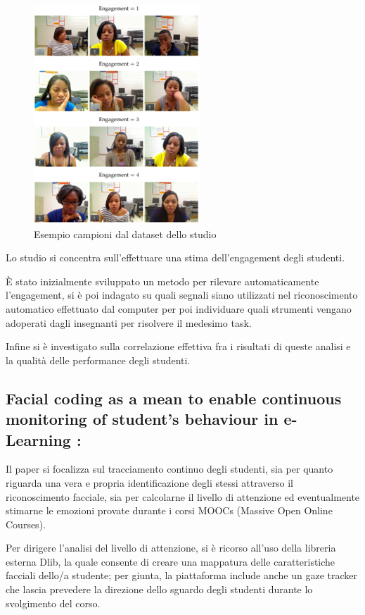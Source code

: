 \begin{figure}
    \begin{center}    
        \includegraphics[width=0.4\linewidth]{images/2.png}
        \caption{Esempio campioni dal dataset dello studio}
    \end{center}
\end{figure}


Lo studio si concentra sull’effettuare una stima dell’engagement degli studenti. 

È stato inizialmente sviluppato un metodo per rilevare automaticamente l’engagement, si è poi indagato su quali segnali siano utilizzati nel riconoscimento automatico effettuato dal computer per poi individuare quali strumenti vengano adoperati dagli insegnanti per risolvere il medesimo task.

Infine si è investigato sulla correlazione effettiva fra i risultati di queste analisi e la qualità delle performance degli studenti.

\subsection{Facial coding as a mean to enable continuous monitoring of student’s behaviour in e-Learning \cite{FacialCodingContinMonitor}:}

Il paper si focalizza sul tracciamento continuo degli studenti, sia per quanto riguarda una vera e propria identificazione degli stessi attraverso il riconoscimento facciale, sia per calcolarne il livello di attenzione ed eventualmente stimarne le emozioni provate durante i corsi MOOCs (Massive Open Online Courses).

Per dirigere l’analisi del livello di attenzione, si è ricorso all’uso della libreria esterna Dlib, la quale consente di creare una mappatura delle caratteristiche facciali dello/a studente; per giunta, la piattaforma include anche un gaze tracker che lascia prevedere la direzione dello sguardo degli studenti durante lo svolgimento del corso.

